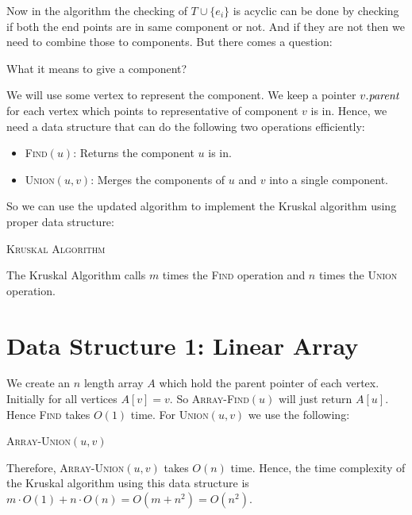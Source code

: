 Now in the algorithm the checking of $T\cup \{e_i\}$ is acyclic can be done by checking if both the end points are in same component or not. And if they are not then we need to combine those to components. But there comes a question:
\begin{question}{}
	What it means to give a component?
\end{question}
We will use some vertex to represent the component. We keep a pointer $v.\emph{parent}$ for each vertex which points to representative of component $v$ is in. Hence, we need a data structure that can do the following two operations efficiently:
\begin{itemize}[label=$\bullet$]
	\item \textsc{Find}$(u)$: Returns the component $u$ is in.
	\item \textsc{Union}$(u,v)$: Merges the components of $u$ and $v$ into a single component.
\end{itemize}
So we can use the updated algorithm to implement the Kruskal algorithm  using proper data structure:
\begin{algorithm}[]
	\caption{\textsc{Kruskal Algorithm}}
	\DontPrintSemicolon
\end{algorithm}
The Kruskal Algorithm calls $m$ times the \textsc{Find} operation and $n$ times the \textsc{Union} operation.
\section{Data Structure 1: Linear Array}
We create an $n$ length array $A$ which hold the parent pointer of each vertex. Initially for all vertices $A[v]=v$. So \textsc{Array-Find}$(u)$ will just return $A[u]$. Hence \textsc{Find} takes $O(1)$ time. For \textsc{Union}$(u,v)$ we use the following:
\begin{algorithm}[]
	\caption{\textsc{Array-Union}$(u,v)$}
	\DontPrintSemicolon
\end{algorithm}
Therefore, \textsc{Array-Union}$(u,v)$ takes $O(n)$ time. Hence, the time complexity of the Kruskal algorithm using this data structure is $m\cdot O(1)+n\cdot O(n)=O(m+n^2)=O(n^2)$.
